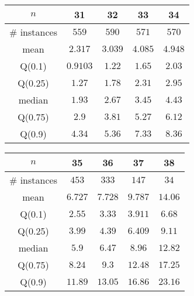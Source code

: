 \begin{tabular}{c|cccc} 
\hline 
$n$ & 31 & 32 & 33 & 34 \tabularnewline 
\hline 
\hline 
\# instances & $559$ & $590$ & $571$ & $570$ \tabularnewline 
mean & $2.317$ & $3.039$ & $4.085$ & $4.948$ \tabularnewline 
Q(0.1) & $0.9103$ & $1.22$ & $1.65$ & $2.03$ \tabularnewline 
Q(0.25) & $1.27$ & $1.78$ & $2.31$ & $2.95$ \tabularnewline 
median & $1.93$ & $2.67$ & $3.45$ & $4.43$ \tabularnewline 
Q(0.75) & $2.9$ & $3.81$ & $5.27$ & $6.12$ \tabularnewline 
Q(0.9) & $4.34$ & $5.36$ & $7.33$ & $8.36$ \tabularnewline 
\hline 
\end{tabular} 
\medskip{} 

\begin{tabular}{c|cccc} 
\hline 
$n$ & 35 & 36 & 37 & 38 \tabularnewline 
\hline 
\hline 
\# instances & $453$ & $333$ & $147$ & $34$ \tabularnewline 
mean & $6.727$ & $7.728$ & $9.787$ & $14.06$ \tabularnewline 
Q(0.1) & $2.55$ & $3.33$ & $3.911$ & $6.68$ \tabularnewline 
Q(0.25) & $3.99$ & $4.39$ & $6.409$ & $9.11$ \tabularnewline 
median & $5.9$ & $6.47$ & $8.96$ & $12.82$ \tabularnewline 
Q(0.75) & $8.24$ & $9.3$ & $12.48$ & $17.25$ \tabularnewline 
Q(0.9) & $11.89$ & $13.05$ & $16.86$ & $23.16$ \tabularnewline 
\hline 
\end{tabular} 
\medskip{} 

